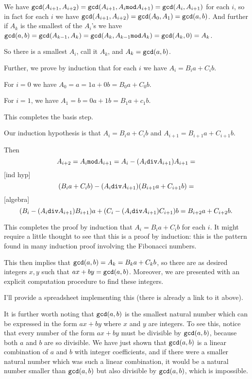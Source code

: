 \documentclass[12pt]{article}
\begin{document}
We have ${\tt gcd}(A_{i+1},A_{i+2}) = {\tt gcd}(A_{i+1},A_i {\tt mod}A_{i+1}) = {\tt gcd}(A_i,A_{i+1})$ for each $i$, so in fact for each $i$ we have
${\tt gcd}(A_{i+1},A_{i+2})  = {\tt gcd}(A_0,A_1) = {\tt gcd}(a,b)$.  And further if $A_k$ is the smallest of the $A_i$'s we have ${\tt gcd}(a,b) = {\tt gcd}(A_{k-1},A_k) = {\tt gcd}(A_k,A_{k-1}{\tt mod}A_k) = {\tt gcd}(A_k,0) = A_k$.

So there is a smallest $A_i$, call it $A_k$, and $A_k = {\tt gcd}(a,b)$.

Further, we prove by induction that for each $i$ we have $A_i = B_ia + C_ib$.

For $i=0$ we have $A_0 = a = 1a+0b = B_0a + C_0b$.

For $i=1$, we have $A_1 = b = 0a+1b = B_1a+c_1b$.

This completes the basis step.

Our induction hypothesis is that $A_i = B_ia+C_ib$ and $A_{i+1} = B_{i+1}a + C_{i+1}b$.

Then $$A_{i+2} = A_i {\tt mod}A_{i+1} = A_i - (A_i {\tt div}A_{i+1})A_{i+1} =$$ [ind hyp] $$( B_ia+C_ib) - (A_i {\tt div}A_{i+1})(B_{i+1}a + C_{i+1}b) = $$[algebra]
$$(B_i - (A_i {\tt div} A_{i+1})B_{i+1})a + (C_i - (A_i {\tt div} A_{i+1})C_{i+1})b = B_{i+2}a + C_{i+2}b.$$

This completes the proof by induction that $A_i = B_ia+C_ib$ for each $i$.  It might require a little thought to see that this is a proof by induction:  this is the pattern found in many induction proof involving the Fibonacci numbers.

This then implies that ${\tt gcd}(a,b) = A_k = B_ka + C_kb$, so there are as desired integers $x,y$ such that $ax+by = {\tt gcd}(a,b)$.  Moreover, we are presented with an explicit computation procedure to find these integers.

I'll provide a spreadsheet implementing this (there is already a link to it above).

It is further worth noting that ${\tt gcd}(a,b)$ is the smallest natural number which can be expressed
in the form $ax+by$ where $x$ and $y$ are integers.  To see this, notice that every number of the form 
$ax+by$ must be divisible by ${\tt gcd}(a,b)$, because both $a$ and $b$ are so divisible.   We have just shown that ${\tt gcd}(a,b)$ is a linear combination of $a$ and $b$ with integer coefficients, and if there were a smaller natural number which was such a linear combination, it would be a natural number smaller than ${\tt gcd}(a,b)$ but also divisible by ${\tt gcd}(a,b)$, which is impossible.
\end{document}
